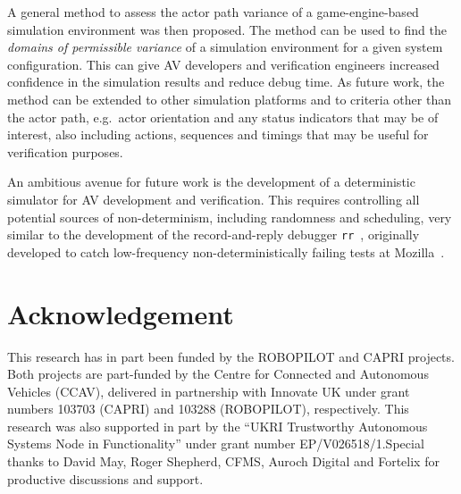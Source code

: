 A general method to assess the actor path variance of a game-engine-based simulation environment was then proposed. The method can be used to find the \textit{domains of permissible variance} of a simulation environment for a given system configuration. This can give AV developers and verification engineers increased confidence in the simulation results and reduce debug time. As future work, the method can be extended to other simulation platforms and to criteria other than the actor path, e.g.\ actor orientation and any status indicators that may be of interest, also including actions, sequences and timings that may be useful for verification purposes.

An ambitious avenue for future work is the development of a deterministic simulator for AV development and verification. This requires controlling all potential sources of non-determinism, including randomness and scheduling, very similar to the development of the record-and-reply debugger \texttt{rr}~\cite{RR_link}, originally developed to catch low-frequency non-deterministically failing tests at Mozilla~\cite{acm-q-rr-interview}.

\section*{Acknowledgement}
This research has in part been funded by the ROBOPILOT and CAPRI projects. Both projects are part-funded by the Centre for Connected and Autonomous Vehicles (CCAV), delivered in partnership with Innovate UK under grant numbers 103703 (CAPRI) and 103288 (ROBOPILOT), respectively. This research was also supported in part by the “UKRI Trustworthy Autonomous Systems Node in Functionality” under grant number EP/V026518/1.Special thanks to David May, Roger Shepherd, CFMS, Auroch Digital and Fortelix for productive discussions and support.
